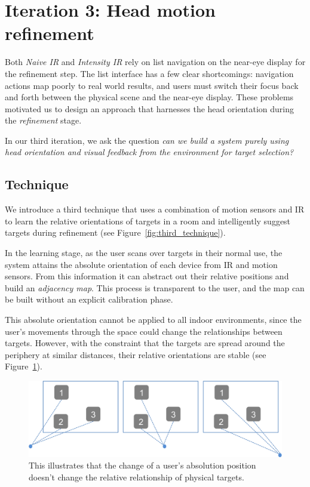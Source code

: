 \section{Iteration 3: Head motion refinement}
\label{sec:iteration-3:-head}

Both {\em Naive IR} and {\em Intensity IR} rely on list navigation on the
near-eye display for the refinement step. The list interface has a few clear
shortcomings: navigation actions map poorly to real world results, and
users must switch their focus back and forth between the physical scene and the
near-eye display. These problems motivated us to design an approach that
harnesses the head orientation during the {\em refinement} stage.

In our third iteration, we ask the question {\em can we build a system purely
using head orientation and visual feedback from the environment for target
selection?}

\subsection{Technique}

We introduce a third technique that uses a combination of motion sensors and IR
to learn the relative orientations of targets in a room and intelligently
suggest targets during refinement (see Figure~\ref{fig:third_technique}).

In the learning stage, as the user scans over targets in their normal use, the
system attains the absolute orientation of each device from IR and motion
sensors. From this information it can abstract out their relative positions and
build an {\em adjacency map}. This process is transparent to the user, and the
map can be built without an explicit calibration phase.

This absolute orientation cannot be applied to all indoor environments, since
the user's movements through the space could change the relationships between
targets. However, with the constraint that the targets are spread around the
periphery at similar distances, their relative orientations are stable (see
Figure~\ref{fig:third_principle}).

\begin{figure}[t]
\centering
\includegraphics[width=0.95\columnwidth]{figures/third_principle.png}
\caption{This illustrates that the change of a user's absolution position
doesn't change the relative relationship of physical targets.}
\label{fig:third_principle}
\end{figure}


